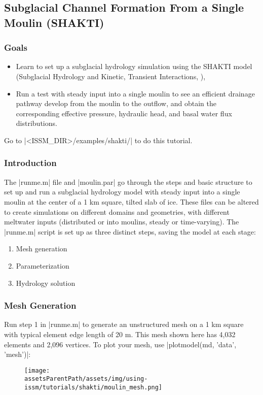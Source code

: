
\subsection{Subglacial Channel Formation From a Single Moulin (SHAKTI)} \label{sec:using-issm-tutorials-shakti}
\subsubsection{Goals} %
\begin{itemize}
	\item Learn to set up a subglacial hydrology simulation using the SHAKTI model (Subglacial Hydrology and Kinetic, Transient Interactions, \cite{Sommers2018}),
	\item Run a test with steady input into a single moulin to see an efficient drainage pathway develop from the moulin to the outflow, and obtain the corresponding effective pressure, hydraulic head, and basal water flux distributions.
\end{itemize} 

Go to \lstinlinebg|<ISSM_DIR>/examples/shakti/| to do this tutorial.
\subsubsection{Introduction}
The \lstinlinebg|runme.m| file and \lstinlinebg|moulin.par| go through the steps and basic structure to set up and run a subglacial hydrology model with steady input into a single moulin at the center of a 1 km square, tilted slab of ice. These files can be altered to create simulations on different domains and geometries, with different meltwater inputs (distributed or into moulins, steady or time-varying). The \lstinlinebg|runme.m| script is set up as three distinct steps, saving the model at each stage:
\begin{enumerate}
	\item Mesh generation
	\item Parameterization
	\item Hydrology solution
\end{enumerate}

\subsubsection{Mesh Generation}
Run step 1 in \lstinlinebg|runme.m| to generate an unstructured mesh on a 1 km square with typical element edge length of 20 m. This mesh shown here has 4,032 elements and 2,096 vertices. To plot your mesh, use \lstinlinebg|plotmodel(md, 'data', 'mesh')|:
\begin{figure}[H]
	\begin{center}
		\texttt{[image: \\assetsParentPath/assets/img/using-issm/tutorials/shakti/moulin\_mesh.png]}
	\end{center}
\end{figure}


